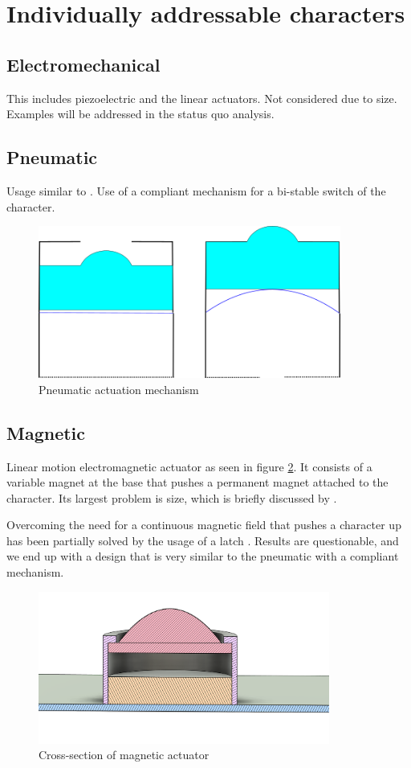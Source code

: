 \section{Individually addressable characters}
\subsection{Electromechanical}
This includes piezoelectric and the linear actuators. Not considered due to size. Examples will be addressed in the status quo analysis.

\subsection{Pneumatic}
Usage similar to \cite{XieZhixin2021A2rB}. Use of a compliant mechanism for a bi-stable switch of the character.  
\begin{figure}[h]
\centering
    \includegraphics[height=5cm]{figures/pneumatic.png}
\caption{Pneumatic actuation mechanism}
\label{fig:pneumatic.png}
\end{figure}

\subsection{Magnetic}

Linear motion electromagnetic actuator as seen in figure \ref{fig:magnet-cross_section.png}.
It consists of a variable magnet at the base that pushes a permanent magnet attached to the character. Its largest problem is size, which is briefly discussed by \cite{BettelaniGemmaCarolina2020DaVo}.


Overcoming the need for a continuous magnetic field that pushes a character up has been partially solved by the usage of a latch \cite{KimJoonyeong2020BDfP}. Results are questionable, and we end up with a design that is very similar to the pneumatic with a compliant mechanism.


\begin{figure}[h]
\centering
    \includegraphics[height=5cm]{figures/magnet-cross_section.png}
\caption{Cross-section of magnetic actuator}
\label{fig:magnet-cross_section.png}
\end{figure}


